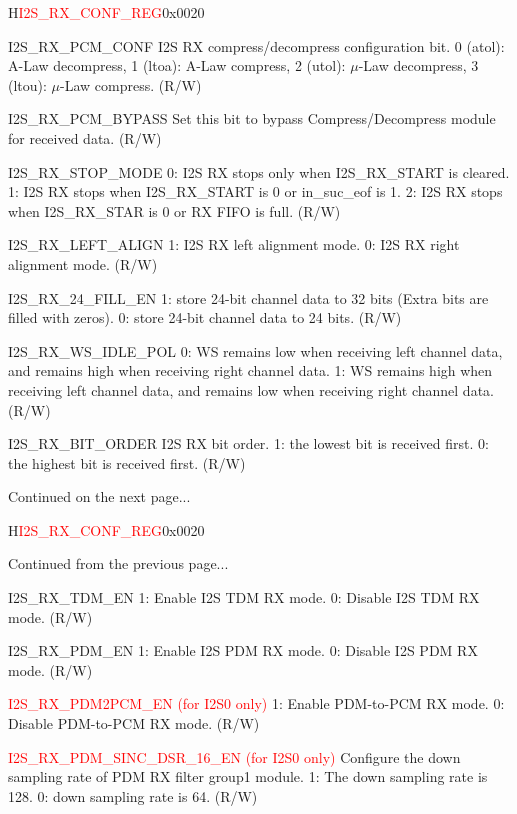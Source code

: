 \begin{register}{H}{\textcolor{red}{I2S\_RX\_CONF\_REG}}{0x{}0020}
\begin{regdesc}
\begin{reglist}
\label{fielddesc:I2SRXPCMCONF}\item [I2S\_RX\_PCM\_CONF] I2S RX compress/decompress configuration bit. 0 (atol): A-Law decompress, 1 (ltoa): A-Law compress, 2 (utol): $\mu$-Law decompress, 3 (ltou): $\mu$-Law compress. (R/W)
\label{fielddesc:I2SRXPCMBYPASS}\item [I2S\_RX\_PCM\_BYPASS] Set this bit to bypass Compress/Decompress module for received data. (R/W)
\label{fielddesc:I2SRXSTOPMODE}\item [I2S\_RX\_STOP\_MODE] 0: I2S RX stops only when I2S\_RX\_START is cleared. 1: I2S RX stops when I2S\_RX\_START is 0 or in\_suc\_eof is 1. 2: I2S RX stops when I2S\_RX\_STAR is 0 or RX FIFO is full. (R/W)
\label{fielddesc:I2SRXLEFTALIGN}\item [I2S\_RX\_LEFT\_ALIGN] 1: I2S RX left alignment mode. 0: I2S RX right alignment mode. (R/W)
\label{fielddesc:I2SRX24FILLEN}\item [I2S\_RX\_24\_FILL\_EN] 1: store 24-bit channel data to 32 bits (Extra bits are filled with zeros). 0: store 24-bit channel data to 24 bits. (R/W)
\label{fielddesc:I2SRXWSIDLEPOL}\item [I2S\_RX\_WS\_IDLE\_POL] 0: WS remains low when receiving left channel data, and remains high when receiving right channel data. 1: WS remains high when receiving left channel data, and remains low when receiving right channel data. (R/W)
\label{fielddesc:I2SRXBITORDER}\item [I2S\_RX\_BIT\_ORDER] I2S RX bit order. 1: the lowest bit is received first. 0: the highest bit is received first. (R/W)
\item [Continued on the next page...]
\end{reglist}\end{regdesc}
\end{register}

\addtocounter{Regfloat}{-1}
\begin{register}{H}{\textcolor{red}{I2S\_RX\_CONF\_REG}}{0x{}0020}
\begin{regdesc}\begin{reglist}
\item [Continued from the previous page...]
\label{fielddesc:I2SRXTDMEN}\item [I2S\_RX\_TDM\_EN] 1: Enable I2S TDM RX mode. 0: Disable I2S TDM RX mode. (R/W)
\label{fielddesc:I2SRXPDMEN}\item [I2S\_RX\_PDM\_EN] 1: Enable I2S PDM RX mode. 0: Disable I2S PDM RX mode. (R/W)
\label{fielddesc:I2SRXPDM2PCMEN}\item [\textcolor{red}{I2S\_RX\_PDM2PCM\_EN (for I2S0 only)}] 1: Enable PDM-to-PCM RX mode. 0: Disable PDM-to-PCM RX mode. (R/W)
\label{fielddesc:I2SRXPDMSINCDSR16EN}\item [\textcolor{red}{I2S\_RX\_PDM\_SINC\_DSR\_16\_EN (for I2S0 only)}] Configure the down sampling rate of PDM RX filter group1 module. 1: The down sampling rate is 128. 0: down sampling rate is 64. (R/W)
\end{reglist}\end{regdesc}
\end{register}


